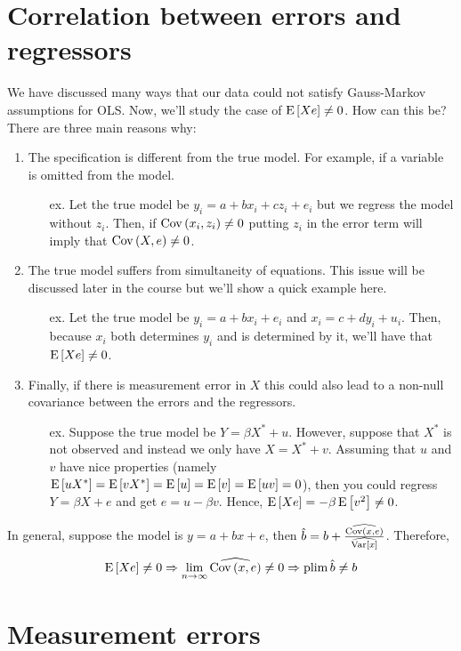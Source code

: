 \section{Correlation between errors and regressors}

We have discussed many ways that our data could not satisfy Gauss-Markov assumptions for OLS. Now, we'll study the case of $\operatorname{E}\left[Xe\right] \neq 0$. How can this be? There are three main reasons why:\begin{enumerate}
\item The specification is different from the true model. For example, if a variable is omitted from the model.
\begin{itemize}
\item[ex.] Let the true model be $y_i = a + bx_i + cz_i + e_i$ but we regress the model without $z_i$. Then, if $\operatorname{Cov}\left(x_i, z_i\right)\neq 0$ putting $z_i$ in the error term will imply that $\operatorname{Cov}\left(X,e\right)\neq 0$.
\end{itemize}
\item The true model suffers from simultaneity of equations. This issue will be discussed later in the course but we'll show a quick example here.
\begin{itemize}
\item[ex.] Let the true model be $y_i = a + bx_i + e_i$ and $x_i = c + dy_i + u_i$. Then, because $x_i$ both determines $y_i$ and is determined by it, we'll have that $\operatorname{E}\left[Xe\right] \neq 0$.
\end{itemize}
\item Finally, if there is measurement error in $X$ this could also lead to a non-null covariance between the errors and the regressors.
\begin{itemize}
\item[ex.] Suppose the true model be $Y = \beta X^* + u$. However, suppose that $X^*$ is not observed and instead we only have $X = X^* + v$. Assuming that $u$ and $v$ have nice properties (namely $\operatorname{E}\left[uX^*\right] = \operatorname{E}\left[vX^*\right] = \operatorname{E}\left[u\right] = \operatorname{E}\left[v\right] = \operatorname{E}\left[uv\right] = 0$), then you could regress $Y = \beta X + e$ and get $e = u - \beta v$. Hence, $\operatorname{E}\left[Xe\right] = -\beta\operatorname{E}\left[v^2\right] \neq 0$.
\end{itemize}
\end{enumerate}

In general, suppose the model is $y = a + bx + e$, then $\hat b = b + \frac{\widehat{\operatorname{Cov}\left(x,e\right)}}{\widehat{\operatorname{Var}\left[x\right]}}$. Therefore, $$\operatorname{E}\left[Xe\right]\neq 0\Rightarrow \lim_{n\to\infty} \widehat{\operatorname{Cov}\left(x,e\right)} \neq 0 \Rightarrow \operatorname{plim} \hat b\neq b $$

\section{Measurement errors}

